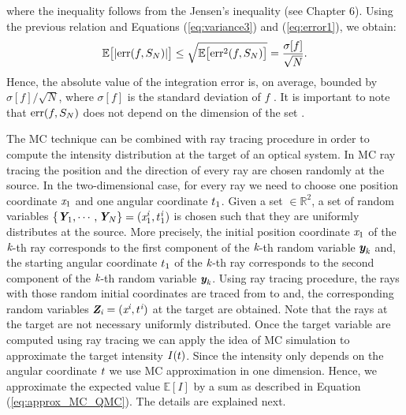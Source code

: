 where the inequality follows from the Jensen's inequality (see \cite{williams1991probability} Chapter $6$).
Using the previous relation and Equations (\ref{eq:variance3}) and (\ref{eq:error1}), we obtain:
\begin{equation}\label{eq:mean_error}
\mathbb{E}\big[|\textrm{err}(f, S_{N})|\big]\leq
\sqrt{\mathbb{E}\big[\textrm{err}^2(f, S_{N})\big]} = \frac{\sigma[f]}{\sqrt{N}}.
\end{equation}
Hence, the absolute value of the integration error is, on average, bounded by $\sigma[f]/\sqrt{N}$, where $\sigma[f]$ is the standard deviation of $f$ \cite{leobacher2014introduction}. It is important to note that $\textrm{err}(f, S_{N})$ does not depend on the dimension of the set .

The MC technique can be combined with ray tracing procedure in order to compute the intensity distribution at the target of an optical system.
In MC ray tracing the position and the direction of every ray are chosen randomly at the source. 
In the two-dimensional case, for every ray we need to choose one position coordinate $\textit{x}_1$ and one angular coordinate $t_1$. Given a set $\in \mathbb{R}^2$, a set of random variables $\{\textit{\textbf{Y}}_1, \cdots, \textit{\textbf{Y}}_N\}= (\textit{x}_{1}^{\textit{i}},t_1^{\textit{i}})$ is chosen such that they are uniformly distributes at the source. More precisely, the initial position coordinate $\textit{x}_1$ of the $\textit{k}$-th ray corresponds to the first component of the $\textit{k}$-th random variable $\textit{\textbf{y}}_{\textit{k}}$ and, the starting angular coordinate $t_1$ of the $\textit{k}$-th ray corresponds to the second component of the $\textit{k}$-th random variable $\textit{\textbf{y}}_{\textit{k}}$.
Using ray tracing procedure, the rays with those random initial coordinates are traced from  to  and, the corresponding random variables $\textit{\textbf{Z}}_{\textit{i}}=(\textit{x}^{\textit{i}},t^{\textit{i}})$ at the target are obtained. Note that the rays at the target are not necessary uniformly distributed. Once the target variable are computed using ray tracing we can apply the idea of MC simulation to approximate the target intensity $I(t)$. Since the intensity only depends on the angular coordinate $t$ we use MC approximation in one dimension. Hence, we approximate the expected value $\mathbb{E}[I]$ by a sum as described in Equation (\ref{eq:approx_MC_QMC}). The details are explained next.



